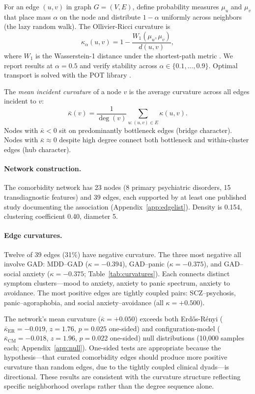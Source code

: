 \documentclass{article}
\begin{document}
For an edge $(u, v)$ in graph $G = (V, E)$, define probability measures $\mu_u$ and $\mu_v$ that place mass $\alpha$ on the node and distribute $1 - \alpha$ uniformly across neighbors (the lazy random walk). The Ollivier-Ricci curvature is
\begin{equation}
  \kappa_\alpha(u, v) = 1 - \frac{W_1(\mu_u, \mu_v)}{d(u, v)},
  \label{eq:orc}
\end{equation}
where $W_1$ is the Wasserstein-1 distance under the shortest-path metric \citep{ollivier2009ricci}. We report results at $\alpha = 0.5$ and verify stability across $\alpha \in \{0.1, \ldots, 0.9\}$. Optimal transport is solved with the POT library \citep{flamary2021pot}.

The \emph{mean incident curvature} of a node $v$ is the average curvature across all edges incident to $v$:
\begin{equation}
  \bar\kappa(v) = \frac{1}{\deg(v)} \sum_{u : (u,v) \in E} \kappa(u, v).
  \label{eq:node_curvature}
\end{equation}
Nodes with $\bar\kappa < 0$ sit on predominantly bottleneck edges (bridge character). Nodes with $\bar\kappa \approx 0$ despite high degree connect both bottleneck and within-cluster edges (hub character).

\paragraph{Network construction.} The comorbidity network has 23 nodes (8 primary psychiatric disorders, 15 transdiagnostic features) and 39 edges, each supported by at least one published study documenting the association (Appendix~\ref{app:edgelist}). Density is 0.154, clustering coefficient 0.40, diameter 5.

\paragraph{Edge curvatures.} Twelve of 39 edges (31\%) have negative curvature. The three most negative all involve GAD: MDD--GAD ($\kappa = -0.394$), GAD--panic ($\kappa = -0.375$), and GAD--social anxiety ($\kappa = -0.375$; Table~\ref{tab:curvatures}). Each connects distinct symptom clusters---mood to anxiety, anxiety to panic spectrum, anxiety to avoidance. The most positive edges are tightly coupled pairs: SCZ--psychosis, panic--agoraphobia, and social anxiety--avoidance (all $\kappa = +0.500$).

The network's mean curvature ($\bar\kappa = +0.050$) exceeds both Erd\H{o}s-R\'{e}nyi ($\bar\kappa_{\text{ER}} = -0.019$, $z = 1.76$, $p = 0.025$ one-sided) and configuration-model ($\bar\kappa_{\text{CM}} = -0.018$, $z = 1.96$, $p = 0.022$ one-sided) null distributions (10{,}000 samples each; Appendix~\ref{app:null}). One-sided tests are appropriate because the hypothesis---that curated comorbidity edges should produce more positive curvature than random edges, due to the tightly coupled clinical dyads---is directional. These results are consistent with the curvature structure reflecting specific neighborhood overlaps rather than the degree sequence alone.
\end{document}
